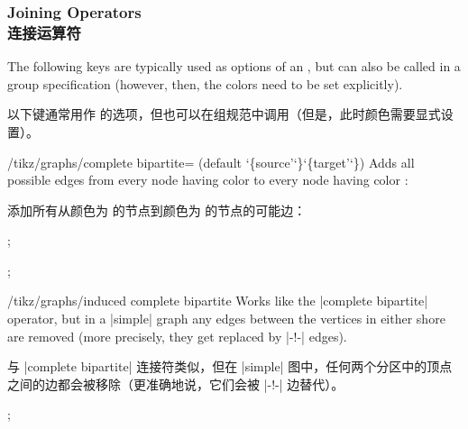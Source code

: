 \subsubsection{Joining Operators\\连接运算符}

The following keys are typically used as options of an , but can also be called in a group specification (however, then,
the colors need to be set explicitly).

以下键通常用作  的选项，但也可以在组规范中调用（但是，此时颜色需要显式设置）。

\begin{key}{/tikz/graphs/complete bipartite= (default \char`\{source'\char`\}\char`\{target'\char`\})}
    Adds all possible edges from every node having color  to
    every node having color :

    添加所有从颜色为  的节点到颜色为  的节点的可能边：    %
\begin{codeexample}[preamble={\usetikzlibrary{graphs}}]
\tikz {};
\end{codeexample}
\begin{codeexample}[preamble={\usetikzlibrary{graphs}}]
\tikz {};
\end{codeexample}
\end{key}

\begin{key}{/tikz/graphs/induced complete bipartite}
    Works like the |complete bipartite| operator, but in a |simple| graph any
    edges between the vertices in either shore are removed (more precisely,
    they get replaced by |-!-| edges).
    
    与 |complete bipartite| 连接符类似，但在 |simple| 图中，任何两个分区中的顶点之间的边都会被移除（更准确地说，它们会被 |-!-| 边替代）。
\begin{codeexample}[preamble={\usetikzlibrary{graphs.standard}}]
\tikz {};
\end{codeexample}
\end{key}

